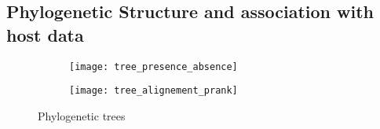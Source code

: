 \subsection*{Phylogenetic Structure and association with host data}
\graphicspath{{images/phylogeneticStructureHostData/}}





\begin{figure}[h]	%
    \centering
    \begin{subfigure}[b]{0.8\textwidth}
        \centering
        \texttt{[image: tree\_presence\_absence]}
        \caption{\scriptsize{}}
        \label{fig:tree_genes}
    \end{subfigure}
    \begin{subfigure}[b]{0.8\textwidth}
        \centering
        \texttt{[image: tree\_alignement\_prank]}
        \caption{}
        \label{fig:tree_align}
    \end{subfigure}
       \caption{Phylogenetic trees}
       \label{fig:trees}
\end{figure}

